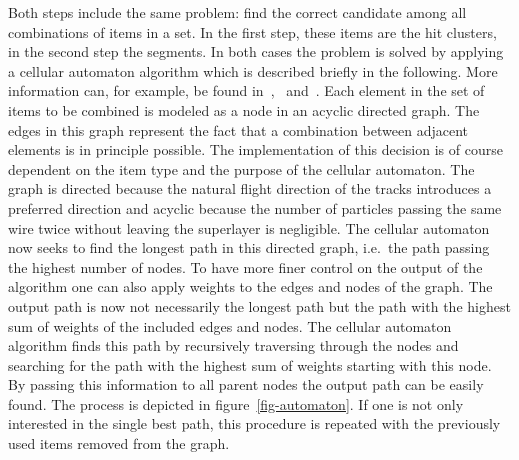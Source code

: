 Both steps include the same problem: find the correct candidate among all combinations of items in a set. In the first step, these items are the hit clusters, in the second step the segments. In both cases the problem is solved by applying a cellular automaton algorithm which is described briefly in the following. More information can, for example, be found in~\cite{cats},~\cite{kisel} and~\cite{oliver}. Each element in the set of items to be combined is modeled as a node in an acyclic directed graph. The edges in this graph represent the fact that a combination between adjacent elements is in principle possible. The implementation of this decision is of course dependent on the item type and the purpose of the cellular automaton. The graph is directed because the natural flight direction of the tracks introduces a preferred direction and acyclic because the number of particles passing the same wire twice without leaving the superlayer is negligible. The cellular automaton now seeks to find the longest path in this directed graph, i.e.\ the path passing the highest number of nodes. To have more finer control on the output of the algorithm one can also apply weights to the edges and nodes of the graph. The output path is now not necessarily the longest path but the path with the highest sum of weights of the included edges and nodes. The cellular automaton algorithm finds this path by recursively traversing through the nodes and searching for the path with the highest sum of weights starting with this node. By passing this information to all parent nodes the output path can be easily found. The process is depicted in figure~\ref{fig-automaton}. If one is not only interested in the single best path, this procedure is repeated with the previously used items removed from the graph.

